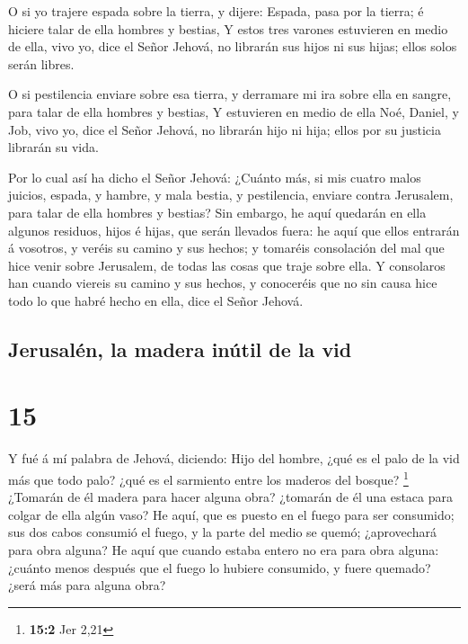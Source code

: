  O si yo trajere espada sobre la tierra, y dijere:
Espada, pasa por la tierra; é hiciere talar de ella hombres y bestias,
 Y estos tres varones estuvieren en medio de ella, vivo
yo, dice el Señor Jehová, no librarán sus hijos ni sus hijas; ellos
solos serán libres.

 O si pestilencia enviare sobre esa tierra, y derramare
mi ira sobre ella en sangre, para talar de ella hombres y bestias,
 Y estuvieren en medio de ella Noé, Daniel, y Job, vivo
yo, dice el Señor Jehová, no librarán hijo ni hija; ellos por su
justicia librarán su vida.

 Por lo cual así ha dicho el Señor Jehová: ¿Cuánto más,
si mis cuatro malos juicios, espada, y hambre, y mala bestia, y
pestilencia, enviare contra Jerusalem, para talar de ella hombres y
bestias?  Sin embargo, he aquí quedarán en ella algunos
residuos, hijos é hijas, que serán llevados fuera: he aquí que ellos
entrarán á vosotros, y veréis su camino y sus hechos; y tomaréis
consolación del mal que hice venir sobre Jerusalem, de todas las cosas
que traje sobre ella.  Y consolaros han cuando viereis su
camino y sus hechos, y conoceréis que no sin causa hice todo lo que
habré hecho en ella, dice el Señor Jehová.

\hypertarget{jerusaluxe9n-la-madera-inuxfatil-de-la-vid}{%
\subsection{Jerusalén, la madera inútil de la
vid}\label{jerusaluxe9n-la-madera-inuxfatil-de-la-vid}}

\hypertarget{section-14}{%
\section{15}\label{section-14}}

 Y fué á mí palabra de Jehová, diciendo: 
Hijo del hombre, ¿qué es el palo de la vid más que todo palo? ¿qué es el
sarmiento entre los maderos del bosque? \footnote{\textbf{15:2} Jer 2,21}
 ¿Tomarán de él madera para hacer alguna obra? ¿tomarán de
él una estaca para colgar de ella algún vaso?  He aquí,
que es puesto en el fuego para ser consumido; sus dos cabos consumió el
fuego, y la parte del medio se quemó; ¿aprovechará para obra alguna?
 He aquí que cuando estaba entero no era para obra alguna:
¿cuánto menos después que el fuego lo hubiere consumido, y fuere
quemado? ¿será más para alguna obra?

